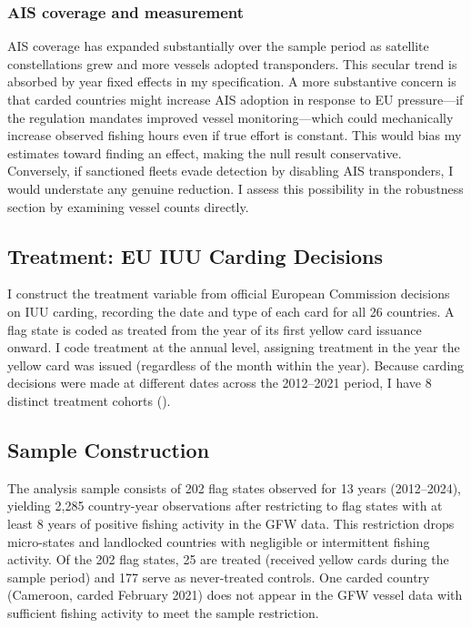 \documentclass[12pt]{article}
\begin{document}
\subsubsection*{AIS coverage and measurement} AIS coverage has expanded substantially over the sample period as satellite constellations grew and more vessels adopted transponders. This secular trend is absorbed by year fixed effects in my specification. A more substantive concern is that carded countries might increase AIS adoption in response to EU pressure---if the regulation mandates improved vessel monitoring---which could mechanically increase observed fishing hours even if true effort is constant. This would bias my estimates toward finding an effect, making the null result conservative. Conversely, if sanctioned fleets evade detection by disabling AIS transponders, I would understate any genuine reduction. I assess this possibility in the robustness section by examining vessel counts directly.

\subsection{Treatment: EU IUU Carding Decisions}

I construct the treatment variable from official European Commission decisions on IUU carding, recording the date and type of each card for all 26 countries. A flag state is coded as treated from the year of its first yellow card issuance onward. I code treatment at the annual level, assigning treatment in the year the yellow card was issued (regardless of the month within the year). Because carding decisions were made at different dates across the 2012--2021 period, I have 8 distinct treatment cohorts ().

\subsection{Sample Construction}

The analysis sample consists of 202 flag states observed for 13 years (2012--2024), yielding 2,285 country-year observations after restricting to flag states with at least 8 years of positive fishing activity in the GFW data. This restriction drops micro-states and landlocked countries with negligible or intermittent fishing activity. Of the 202 flag states, 25 are treated (received yellow cards during the sample period) and 177 serve as never-treated controls. One carded country (Cameroon, carded February 2021) does not appear in the GFW vessel data with sufficient fishing activity to meet the sample restriction.
\end{document}
